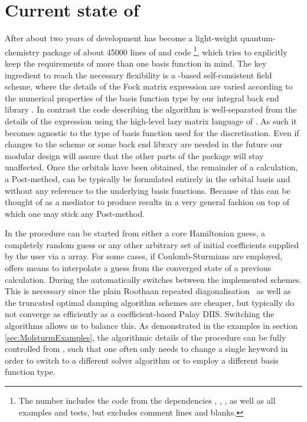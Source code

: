 \section{Current state of \molsturm}
\label{sec:MolsturmState}

After about two years of development
\molsturm has become a light-weight quantum-chemistry package of about 45000
lines of \cpp and \python code%
\footnote{The number includes the code from the dependencies
\gint, \gscf, \lazyten, \krims as well as
all examples and tests, but excludes comment lines and blanks.},
which tries to explicitly keep the requirements of more than
one basis function in mind.
The key ingredient to reach the necessary flexibility
is a \contraction-based self-consistent field scheme,
where the details of the Fock matrix \contraction expression
are varied according to the numerical properties of the basis function type
by our integral back end library \gint.
In contrast the code describing the \SCF algorithm
is well-separated from the details of the \contraction expression
using the high-level lazy matrix language of \lazyten.
As such it becomes agnostic to the type of basis function used for the discretisation.
Even if changes to the \SCF scheme or some back end
library are needed in the future our modular design
will assure that the other parts of the \molsturm package will stay unaffected.
Once the \SCF orbitals have been obtained,
the remainder of a calculation, \eg a Post-\HF method,
can be typically be formulated entirely in the \SCF orbital basis
and without any reference to the underlying basis functions.
Because of this \molsturm can be thought of as a mediator
to produce \SCF results in a very general fashion
on top of which one may stick any Post-\HF method.

In \molsturm the \SCF procedure can be started from either a core Hamiltonian guess,
a completely random guess or any other arbitrary set of initial
coefficients supplied by the user via a \numpy array.
For some cases, \eg if Coulomb-Sturmians are employed,
\molsturm offers means to interpolate a guess
from the converged state of a previous calculation.
During the \SCF \molsturm automatically switches between
the implemented \SCF schemes.
This is necessary since the plain Roothaan
repeated diagonalisation~\cite{Roothaan1951}
as well as the truncated optimal damping algorithm schemes
are cheaper, but typically do not converge as efficiently
as a coefficient-based Pulay DIIS.
Switching the algorithms allows us to balance this.
As demonstrated in the examples in section \ref{sec:MolsturmExamples},
the algorithmic details of the \SCF procedure can be fully controlled
from \python,
such that one often only needs to change a single keyword
in order to switch to a different solver algorithm
or to employ a different basis function type.

